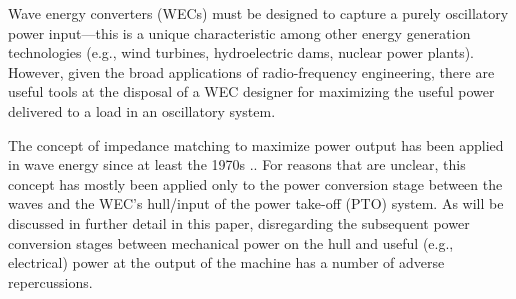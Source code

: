 \documentclass[lettersize,journal]{IEEEtran}
\begin{document}

Wave energy converters (WECs) must be designed to capture a purely oscillatory power input—this is a unique characteristic among other energy generation technologies (e.g., wind turbines, hydroelectric dams, nuclear power plants). 
However, given the broad applications of radio-frequency engineering, there are useful tools at the disposal of a WEC designer for maximizing the useful power delivered to a load in an oscillatory system.

The concept of impedance matching to maximize power output has been applied in wave energy since at least the 1970s \cite{Falnes:1980aa}.. 
For reasons that are unclear, this concept has mostly been applied only to the power conversion stage between the waves and the WEC's hull/input of the power take-off (PTO) system. 
As will be discussed in further detail in this paper, disregarding the subsequent power conversion stages between mechanical power on the hull and useful (e.g., electrical) power at the output of the machine has a number of adverse repercussions.
\end{document}
